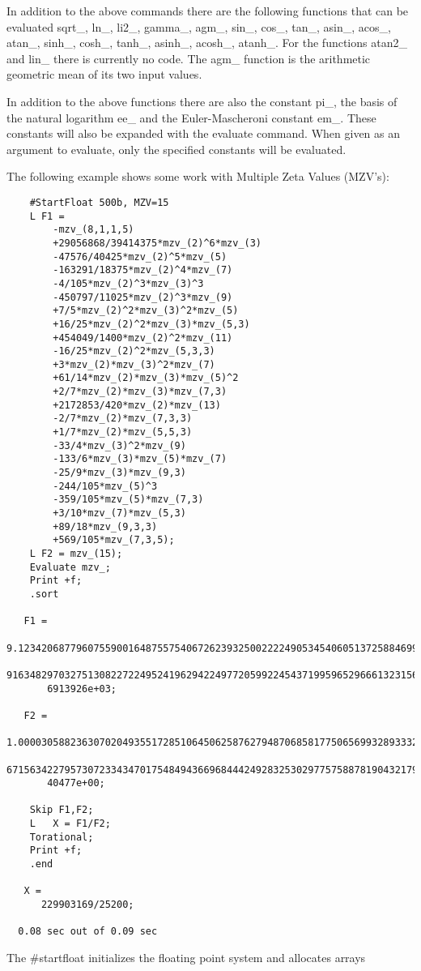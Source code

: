 In addition to the above commands there are the following functions that 
can be evaluated sqrt\_, ln\_, li2\_, gamma\_, agm\_, sin\_, cos\_, tan\_,
asin\_, acos\_, atan\_, sinh\_, cosh\_, tanh\_, asinh\_, acosh\_, atanh\_.
For the functions atan2\_ and lin\_ there is currently no code.
The agm\_ function is the arithmetic geometric mean of its two input 
values.

In addition to the above functions there are also the constant 
pi\_, the basis of the natural logarithm ee\_ and the 
Euler-Mascheroni constant em\_. These constants will also be 
expanded with the evaluate command. When given as an argument to evaluate, 
only the specified constants will be evaluated.

The following example shows some work with Multiple Zeta Values (MZV's):
\begin{verbatim}
    #StartFloat 500b, MZV=15
    L F1 =
    	-mzv_(8,1,1,5)
    	+29056868/39414375*mzv_(2)^6*mzv_(3)
    	-47576/40425*mzv_(2)^5*mzv_(5)
    	-163291/18375*mzv_(2)^4*mzv_(7)
    	-4/105*mzv_(2)^3*mzv_(3)^3
    	-450797/11025*mzv_(2)^3*mzv_(9)
    	+7/5*mzv_(2)^2*mzv_(3)^2*mzv_(5)
    	+16/25*mzv_(2)^2*mzv_(3)*mzv_(5,3)
    	+454049/1400*mzv_(2)^2*mzv_(11)
    	-16/25*mzv_(2)^2*mzv_(5,3,3)
    	+3*mzv_(2)*mzv_(3)^2*mzv_(7)
    	+61/14*mzv_(2)*mzv_(3)*mzv_(5)^2
    	+2/7*mzv_(2)*mzv_(3)*mzv_(7,3)
    	+2172853/420*mzv_(2)*mzv_(13)
    	-2/7*mzv_(2)*mzv_(7,3,3)
    	+1/7*mzv_(2)*mzv_(5,5,3)
    	-33/4*mzv_(3)^2*mzv_(9)
    	-133/6*mzv_(3)*mzv_(5)*mzv_(7)
    	-25/9*mzv_(3)*mzv_(9,3)
    	-244/105*mzv_(5)^3
    	-359/105*mzv_(5)*mzv_(7,3)
    	+3/10*mzv_(7)*mzv_(5,3)
    	+89/18*mzv_(9,3,3)
    	+569/105*mzv_(7,3,5);
    L F2 = mzv_(15);
    Evaluate mzv_;
    Print +f;
    .sort

   F1 =
       9.1234206877960755900164875575406726239325002222490534540605137258846994\
       916348297032751308227224952419629422497720599224543719959652966613231560\
       6913926e+03;

   F2 =
       1.0000305882363070204935517285106450625876279487068581775065699328933322\
       671563422795730723343470175484943669684442492832530297757588781904321794\
       40477e+00;

    Skip F1,F2;
    L	X = F1/F2;
    Torational;
    Print +f;
    .end

   X =
      229903169/25200;

  0.08 sec out of 0.09 sec
\end{verbatim}
The \#startfloat initializes the floating point system and allocates arrays 
